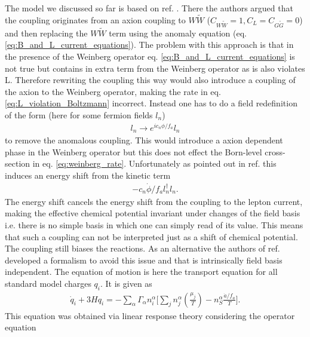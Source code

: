 \documentclass[13pt,a4paper,titlepage]{article}
\begin{document}
The model we discussed so far is based on ref. \cite{Axion_leptogenesis_Kusenko_2015}.
There the authors argued that the coupling originates from an axion coupling to $W \tilde{W}$ ($C_{W \tilde{W}} = 1, C_L = C_{G \tilde{G}} = 0$) and then replacing the $W \tilde{W}$ term using
the anomaly equation (eq. \eqref{eq:B_and_L_current_equations}).
The problem with this approach is that in the presence of the Weinberg operator eq. \eqref{eq:B_and_L_current_equations} is not true but contains in extra term from the Weinberg operator as
is also violates L. Therefore rewriting the coupling this way would also introduce a coupling of
the axion to the Weinberg operator, making the rate in eq. \eqref{eq:L_violation_Boltzmann} incorrect.
Instead one has to do a field redefinition of the form (here for some fermion fields $l_n$)
\begin{align}
    l_n \to e^{i c_n \phi / f_a} l_n
\end{align}
to remove the anomalous coupling. This would introduce a axion dependent phase in the Weinberg operator
but this does not effect the Born-level cross-section in eq. \eqref{eq:weinberg_rate}.
Unfortunately as pointed out in ref. \cite{Shi_2015_Basis_Invariance_chemical_equilibrium} this induces an energy shift from the kinetic term \cite[eq. 6]{Shi_2015_Basis_Invariance_chemical_equilibrium}
\begin{align}
    - c_n \dot{\phi} / {f_a} l_n^{\dagger} l_n.
\end{align}
The energy shift cancels the energy shift from the coupling to the lepton current, making the effective
chemical potential invariant under changes of the field basis i.e. there is no simple basis in which
one can simply read of its value.
This means that such a coupling can not be interpreted just as a shift of chemical potential.
The coupling still biases the reactions.
As an alternative the authors of ref. \cite{Domcke:2020kcp_Generic_Couplings} developed a formalism
to avoid this issue and that is intrinsically field basis independent.
The equation of motion is here the transport equation for all standard model charges $q_i$.
It is
given as \cite[eq. 3.4]{Domcke:2020kcp_Generic_Couplings}
\begin{align}
\label{eq:transport_equation}
\dot{q}_i + 3 H q_i = - \sum_\alpha \Gamma_\alpha n^\alpha_i \Big[
\sum_j n^\alpha_j \left( \frac{\mu_j}{T} \right) - n_S^\alpha \frac{\dot{a} / f_a}{T} \Big].
\end{align}
This equation was obtained via linear response theory considering the operator equation \cite[eq. 2.1]{Domcke:2020kcp_Generic_Couplings}
\end{document}
